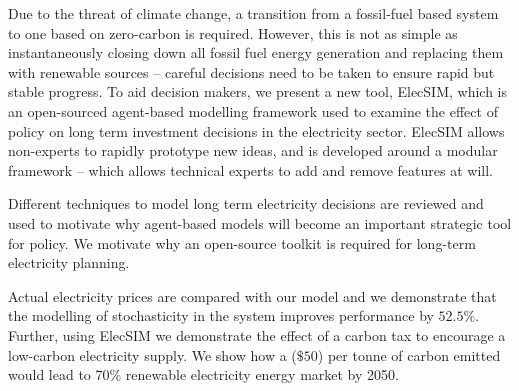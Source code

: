 Due to the threat of climate change, a transition from a fossil-fuel based system to one based on zero-carbon is required. However, this is not as simple as instantaneously closing down all fossil fuel energy generation and replacing them with renewable sources -- careful decisions need to be taken to ensure rapid but stable progress. To aid decision makers, we present a new tool, ElecSIM, which is an open-sourced agent-based modelling framework used to examine the effect of policy on long term investment decisions in the electricity sector. ElecSIM allows non-experts to rapidly prototype new ideas, and is developed around a modular framework -- which allows technical experts to add and remove features at will. 

Different techniques to model long term electricity decisions are reviewed and used to motivate why agent-based models will become an important strategic tool for policy. We motivate why an open-source toolkit is required for long-term electricity planning.

Actual electricity prices are compared with our model and we demonstrate that the modelling of stochasticity in the system improves performance by $52.5\%$. Further, using ElecSIM we demonstrate the effect of a carbon tax to encourage a low-carbon electricity supply. We show how a  ($\$50$) per tonne of carbon emitted would lead to 70\% renewable electricity energy market by 2050. 
